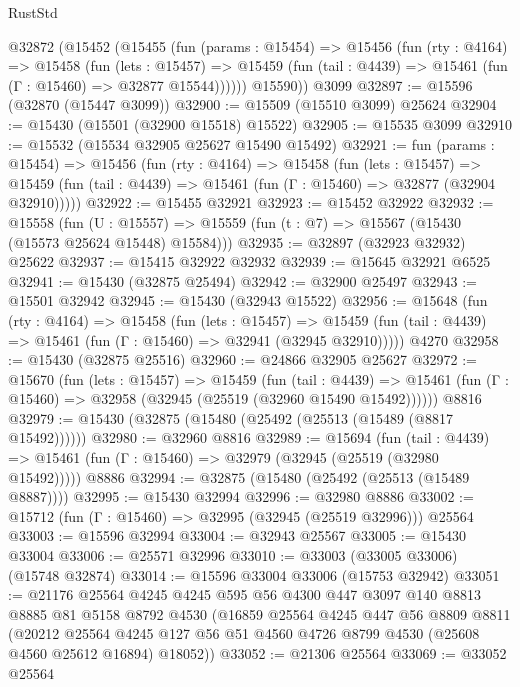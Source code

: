 \begin{lexlean}{RustStd}
\begin{coremodule}
    @32872
      (@15452
        (@15455
          (fun (params : @15454) =>
          @15456
            (fun (rty : @4164) =>
            @15458
              (fun (lets : @15457) =>
              @15459 (fun (tail : @4439) => @15461 (fun (Γ : @15460) => @32877 @15544))))))
        @15590))
    @3099
@32897 := @15596 (@32870 (@15447 @3099))
@32900 := @15509 (@15510 @3099) @25624
@32904 := @15430 (@15501 (@32900 @15518) @15522)
@32905 := @15535 @3099
@32910 := @15532 (@15534 @32905 @25627 @15490 @15492)
@32921 := fun (params : @15454) =>
  @15456
    (fun (rty : @4164) =>
    @15458
      (fun (lets : @15457) =>
      @15459 (fun (tail : @4439) => @15461 (fun (Γ : @15460) => @32877 (@32904 @32910)))))
@32922 := @15455 @32921
@32923 := @15452 @32922
@32932 := @15558
    (fun (U : @15557) => @15559 (fun (t : @7) => @15567 (@15430 (@15573 @25624 @15448) @15584)))
@32935 := @32897 (@32923 @32932) @25622
@32937 := @15415 @32922 @32932
@32939 := @15645 @32921 @6525
@32941 := @15430 (@32875 @25494)
@32942 := @32900 @25497
@32943 := @15501 @32942
@32945 := @15430 (@32943 @15522)
@32956 := @15648
    (fun (rty : @4164) =>
    @15458
      (fun (lets : @15457) =>
      @15459 (fun (tail : @4439) => @15461 (fun (Γ : @15460) => @32941 (@32945 @32910)))))
    @4270
@32958 := @15430 (@32875 @25516)
@32960 := @24866 @32905 @25627
@32972 := @15670
    (fun (lets : @15457) =>
    @15459
      (fun (tail : @4439) =>
      @15461 (fun (Γ : @15460) => @32958 (@32945 (@25519 (@32960 @15490 @15492))))))
    @8816
@32979 := @15430 (@32875 (@15480 (@25492 (@25513 (@15489 (@8817 @15492))))))
@32980 := @32960 @8816
@32989 := @15694
    (fun (tail : @4439) => @15461 (fun (Γ : @15460) => @32979 (@32945 (@25519 (@32980 @15492)))))
    @8886
@32994 := @32875 (@15480 (@25492 (@25513 (@15489 @8887))))
@32995 := @15430 @32994
@32996 := @32980 @8886
@33002 := @15712 (fun (Γ : @15460) => @32995 (@32945 (@25519 @32996))) @25564
@33003 := @15596 @32994
@33004 := @32943 @25567
@33005 := @15430 @33004
@33006 := @25571 @32996
@33010 := @33003 (@33005 @33006) (@15748 @32874)
@33014 := @15596 @33004 @33006 (@15753 @32942)
@33051 := @21176
    @25564
    @4245
    @4245
    @595
    @56
    @4300
    @447
    @3097
    @140
    @8813
    @8885
    @81
    @5158
    @8792
    @4530
    (@16859
      @25564
      @4245
      @447
      @56
      @8809
      @8811
      (@20212
        @25564
        @4245
        @127
        @56
        @51
        @4560
        @4726
        @8799
        @4530
        (@25608 @4560 @25612 @16894)
        @18052))
@33052 := @21306 @25564
@33069 := @33052
    @25564

\end{coremodule}
\end{lexlean}
